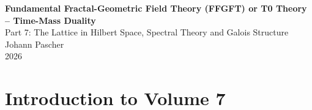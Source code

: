 



	
	\setcounter{section}{0}
	\setcounter{subsection}{0}
	\setcounter{subsubsection}{0}
	\setcounter{paragraph}{0}
	
	\setcounter{secnumdepth}{1}  %
	\makeatletter
	\renewcommand*\l@part[2]{%
		\ifnum \c@tocdepth >-2\relax
		\addpenalty{-\@highpenalty}%
		\addvspace{0.8em \@plus\p@}%
		{\leftskip 0em \relax
			\rightskip \@tocrmarg
			\parfillskip -\rightskip
			\parindent 0em \relax\@afterindenttrue
			\interlinepenalty\@M
			\leavevmode
			{\footnotesize\bfseries #1}\nobreak
			\leaders\hbox{$\m@th\mkern \@dotsep mu\hbox{}\mkern \@dotsep mu$}\hfill
			\nobreak\hb@xt@\@pnumwidth{\hss #2}\par}%
		\addvspace{0.2em \@plus\p@}%
		\nobreak
		\fi}
	\makeatother
	
	\renewcommand{\cftchapfont}{\footnotesize\bfseries}
	\renewcommand{\cftchappagefont}{\footnotesize\bfseries}
	\setlength{\cftbeforechapskip}{0.3em}
	
	\setcounter{tocdepth}{0}
	

	\begin{titlepage}
		\centering
		\vspace*{2cm}
	{\Huge\textbf{Fundamental Fractal-Geometric Field Theory (FFGFT) or T0 Theory – Time-Mass Duality}}\\[1cm]
	{\Large Part 7: The Lattice in Hilbert Space, Spectral Theory and Galois Structure}\\[2cm]
		{\large Johann Pascher}\\[1cm]
		{\large 2026}
		\vfill
	\end{titlepage}

	\frontmatter
	\pagestyle{fancy}
	\makeatletter
	\let\ps@plain\ps@fancy
	\let\ps@empty\ps@fancy
	\makeatother

	\mainmatter
	\pagestyle{fancy}
	\tableofcontents

	\chapter{Introduction to Volume 7}
	

